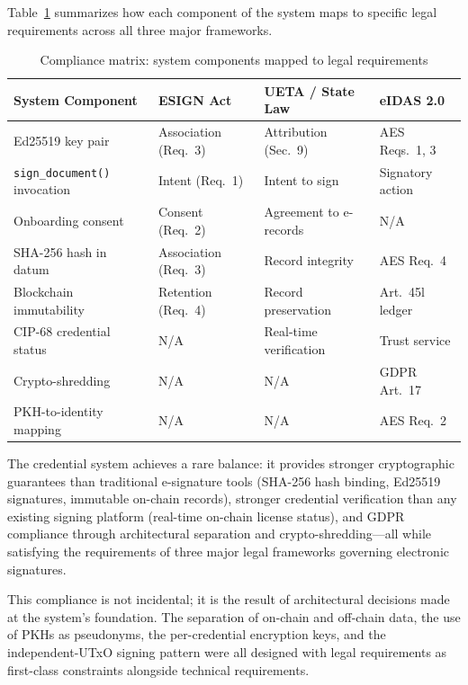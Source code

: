 Table~\ref{tab:compliance-matrix} summarizes how each component of the system
maps to specific legal requirements across all three major frameworks.

\begin{table}[H]
\centering
\caption{Compliance matrix: system components mapped to legal requirements}
\label{tab:compliance-matrix}
\small
\begin{tabular}{@{}p{3cm} p{3.5cm} p{3.5cm} p{3.5cm}@{}}
\toprule
\textbf{System Component} & \textbf{ESIGN Act} & \textbf{UETA / State Law} & \textbf{eIDAS 2.0} \\
\midrule
Ed25519 key pair &
  Association (Req.~3) &
  Attribution (Sec.~9) &
  AES Reqs.~1, 3 \\
\texttt{sign\_document()} invocation &
  Intent (Req.~1) &
  Intent to sign &
  Signatory action \\
Onboarding consent &
  Consent (Req.~2) &
  Agreement to e-records &
  N/A \\
SHA-256 hash in datum &
  Association (Req.~3) &
  Record integrity &
  AES Req.~4 \\
Blockchain immutability &
  Retention (Req.~4) &
  Record preservation &
  Art.~45l ledger \\
CIP-68 credential status &
  N/A &
  Real-time verification &
  Trust service \\
Crypto-shredding &
  N/A &
  N/A &
  GDPR Art.~17 \\
PKH-to-identity mapping &
  N/A &
  N/A &
  AES Req.~2 \\
\bottomrule
\end{tabular}
\end{table}

The credential system achieves a rare balance: it provides stronger
cryptographic guarantees than traditional e-signature tools (SHA-256 hash
binding, Ed25519 signatures, immutable on-chain records), stronger credential
verification than any existing signing platform (real-time on-chain license
status), and GDPR compliance through architectural separation and
crypto-shredding---all while satisfying the requirements of three major
legal frameworks governing electronic signatures.

This compliance is not incidental; it is the result of architectural
decisions made at the system's foundation.  The separation of on-chain and
off-chain data, the use of PKHs as pseudonyms, the per-credential
encryption keys, and the independent-UTxO signing pattern were all
designed with legal requirements as first-class constraints alongside
technical requirements.

